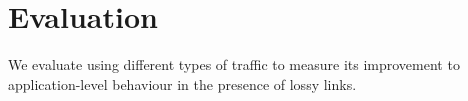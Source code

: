 \section{Evaluation}
We evaluate \OurSys using different types of traffic to measure its improvement
to application-level behaviour in the presence of lossy links.

